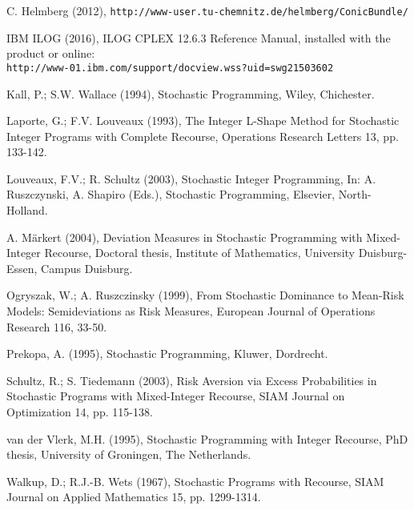 \documentclass[11pt,draft]{article}
\newcommand{\+}{{\ti{+}}}
\newcommand{\1}{{\ti{1}}}
\begin{document}
\begin{thebibliography}{99}

 C. Helmberg (2012), {\small \texttt{http://www-user.tu-chemnitz.de/helmberg/ConicBundle/}}

	IBM ILOG (2016), ILOG CPLEX 12.6.3 Reference Manual, installed with the product or online:\\  \texttt{http://www-01.ibm.com/support/docview.wss?uid=swg21503602}

 Kall, P.; S.W. Wallace (1994), Stochastic Programming, Wiley, Chichester.

 Laporte, G.; F.V. Louveaux (1993), The Integer L-Shape Method for
Stochastic Integer Programs with Complete Recourse, Operations Research Letters 13, pp. 133-142.

 Louveaux, F.V.; R. Schultz (2003), Stochastic Integer Programming, In:
A. Ruszczynski, A. Shapiro (Eds.), Stochastic Programming, Elsevier, North-Holland.

 A. M\"arkert (2004), Deviation Measures in Stochastic Programming with Mixed-Integer
  Recourse, Doctoral thesis, Institute of Mathematics, University Duisburg-Essen, Campus Duisburg.

 Ogryszak, W.; A. Ruszczinsky (1999), From Sto\-chastic
Dominance to Mean-Risk Models: 
Semideviations as Risk Measures, European Journal of Operations Research 116, 33-50.

 Prekopa, A. (1995), Stochastic Programming, Kluwer, Dordrecht.

 Schultz, R.; S. Tiedemann (2003), Risk Aversion via Excess
Probabilities in Stochastic Programs with Mixed-Integer Recourse, SIAM Journal on Optimization 14, pp. 115-138.

 van der Vlerk, M.H. (1995), Stochastic Programming with Integer Recourse, PhD
thesis, University of Groningen, The Netherlands. 

 Walkup, D.; R.J.-B. Wets (1967), Stochastic Programs with Recourse, SIAM
Journal on Applied Mathematics 15, pp. 1299-1314.

\end{thebibliography}
\end{document}

